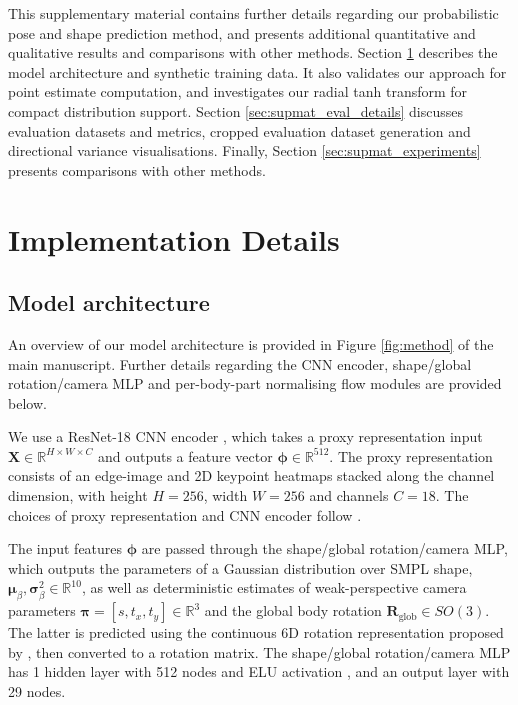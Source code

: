 \appendix
\label{sec:appendix}

This supplementary material contains further details regarding our probabilistic pose and shape prediction method, and presents additional quantitative and qualitative results and comparisons with other methods. Section \ref{sec:supmat_imp_details} describes the model architecture and synthetic training data. It also validates our approach for point estimate computation, and investigates our radial tanh transform for compact distribution support. Section \ref{sec:supmat_eval_details} discusses evaluation datasets and metrics, cropped evaluation dataset generation and directional variance visualisations. Finally, Section \ref{sec:supmat_experiments} presents comparisons with other methods.

\section{Implementation Details}
\label{sec:supmat_imp_details}

\subsection{Model architecture}

An overview of our model architecture is provided in Figure \ref{fig:method} of the main manuscript. Further details regarding the CNN encoder, shape/global rotation/camera MLP and per-body-part normalising flow modules are provided below.

We use a ResNet-18 CNN encoder \cite{He2015}, which takes a proxy representation input $\mathbf{X} \in \mathbb{R}^{H \times W \times C}$ and outputs a feature vector $\boldsymbol{\phi} \in \mathbb{R}^{512}$. The proxy representation consists of an edge-image and 2D keypoint heatmaps stacked along the channel dimension, with height $H = 256$, width $W = 256$ and channels $C = 18$. The choices of proxy representation and CNN encoder follow \cite{sengupta2021hierprobhuman}.

The input features $\boldsymbol{\phi}$ are passed through the shape/global rotation/camera MLP, which outputs the parameters of a Gaussian distribution over SMPL \cite{SMPL:2015} shape, $\boldsymbol{\mu}_\beta, \boldsymbol{\sigma}^2_\beta \in \mathbb{R}^{10}$, as well as deterministic estimates of weak-perspective camera parameters $\pmb{\pi} = [s, t_x, t_y] \in \mathbb{R}^3$ and the global body rotation $\mathbf{R}_\text{glob} \in SO(3)$. The latter is predicted using the continuous 6D rotation representation proposed by \cite{Zhou_2019_CVPR}, then converted to a rotation matrix. The shape/global rotation/camera MLP has 1 hidden layer with 512 nodes and ELU activation \cite{clevert2016elu}, and an output layer with 29 nodes.


